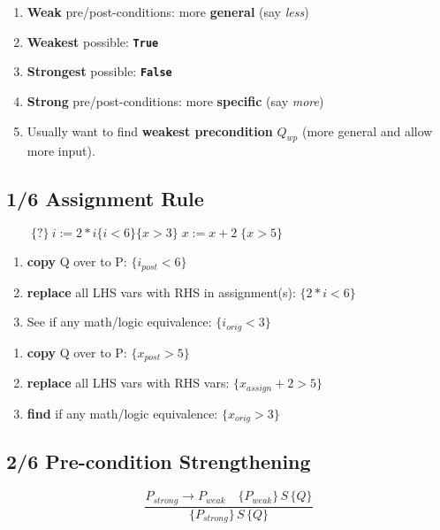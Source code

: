 \begin{enumerate}
\item \textbf{Weak} pre/post-conditions: more \textbf{general} (say \emph{less})
\item \textbf{Weakest} possible: \textbf{\texttt{True}}
\item \textbf{Strongest} possible: \textbf{\texttt{False}}
\item \textbf{Strong} pre/post-conditions: more \textbf{specific} (say \emph{more})
\item Usually want to find \textbf{weakest precondition} $Q_{wp}$ (more general and allow more input).
\end{enumerate}

\subsection*{1/6 Assignment Rule}
\(\qquad\{?\}\ i := 2 * i \{i < 6\}\)\hfill\(\{x > 3\}\;x:=x+2\;\{x>5\}\)\\
\begin{minipage}{0.5\linewidth}
\begin{enumerate}
\item \textbf{copy} Q over to P: \(\{i_{post} < 6\}\)
\item \textbf{replace} all LHS vars with RHS in assignment(s): \(\{2 * i < 6\}\)
\item See if any math/logic equivalence: \(\{i_{orig} < 3\}\)
\end{enumerate}
\end{minipage}
\begin{minipage}{0.5\linewidth}
\begin{enumerate}
\item \textbf{copy} Q over to P: \(\{x_{post} > 5\}\)
\item \textbf{replace} all LHS vars with RHS vars: \(\{x_{assign}+2 > 5\}\)
\item \textbf{find} if any math/logic equivalence: \(\{x_{orig} > 3\}\)
\end{enumerate}
\end{minipage}

\subsection*{2/6 Pre-condition Strengthening}
\begin{displaymath}
  \frac{P_{strong} \rightarrow P_{weak} \quad \{P_{weak}\}\,S\,\{Q\} } {\{P_{strong}\}\,S\,\{Q\}}
\end{displaymath}

